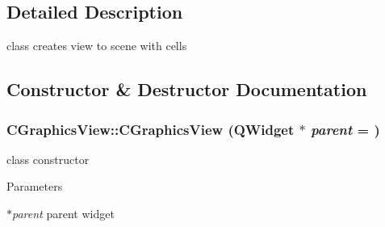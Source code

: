 \subsection{Detailed Description}
class creates view to scene with cells 

\subsection{Constructor \& Destructor Documentation}
\hypertarget{classCGraphicsView_ab8f66777de03ec943fbaede5f59e36bf}{
\subsubsection[{CGraphicsView}]{\setlength{\rightskip}{0pt plus 5cm}CGraphicsView::CGraphicsView (QWidget $\ast$ {\em parent} = {})}}
\label{classCGraphicsView_ab8f66777de03ec943fbaede5f59e36bf}
class constructor


\begin{DoxyParams}{Parameters}
\item[{\em $\ast$parent}]parent widget \end{DoxyParams}


